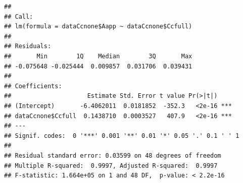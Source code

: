 \documentclass[
]{krantz}
\makeatletter
\newenvironment{Shaded}{\begin{snugshade}}{\end{snugshade}}
\newcommand{\CommentTok}[1]{\textcolor[rgb]{0.56,0.35,0.01}{\textit{#1}}}
\newcommand{\DecValTok}[1]{\textcolor[rgb]{0.00,0.00,0.81}{#1}}
\newcommand{\FunctionTok}[1]{\textcolor[rgb]{0.00,0.00,0.00}{#1}}
\newcommand{\NormalTok}[1]{#1}
\newcommand{\OtherTok}[1]{\textcolor[rgb]{0.56,0.35,0.01}{#1}}
\newcommand{\SpecialCharTok}[1]{\textcolor[rgb]{0.00,0.00,0.00}{#1}}
\newcommand{\StringTok}[1]{\textcolor[rgb]{0.31,0.60,0.02}{#1}}
\newenvironment{kframe}{%
\medskip{}
\setlength{\fboxsep}{.8em}
 \def\at@end@of@kframe{}%
 \ifinner\ifhmode%
  \def\at@end@of@kframe{\end{minipage}}%
  \begin{minipage}{\columnwidth}%
 \fi\fi%
 \def\FrameCommand##1{\hskip\@totalleftmargin \hskip-\fboxsep
 \colorbox{shadecolor}{##1}\hskip-\fboxsep
     \hskip-\linewidth \hskip-\@totalleftmargin \hskip\columnwidth}%
 \MakeFramed {\advance\hsize-\width
   \@totalleftmargin\z@ \linewidth\hsize
   \@setminipage}}%
 {\par\unskip\endMakeFramed%
 \at@end@of@kframe}
\renewenvironment{Shaded}{\begin{kframe}}{\end{kframe}}
\makeatother
\begin{document}
\begin{Shaded}
\end{Shaded}

\begin{verbatim}
## 
## Call:
## lm(formula = dataCcnone$Aapp ~ dataCcnone$Ccfull)
## 
## Residuals:
##       Min        1Q    Median        3Q       Max 
## -0.075648 -0.025444  0.009857  0.031706  0.039431 
## 
## Coefficients:
##                     Estimate Std. Error t value Pr(>|t|)    
## (Intercept)       -6.4062011  0.0181852  -352.3   <2e-16 ***
## dataCcnone$Ccfull  0.1438710  0.0003527   407.9   <2e-16 ***
## ---
## Signif. codes:  0 '***' 0.001 '**' 0.01 '*' 0.05 '.' 0.1 ' ' 1
## 
## Residual standard error: 0.03599 on 48 degrees of freedom
## Multiple R-squared:  0.9997, Adjusted R-squared:  0.9997 
## F-statistic: 1.664e+05 on 1 and 48 DF,  p-value: < 2.2e-16
\end{verbatim}
\end{document}
